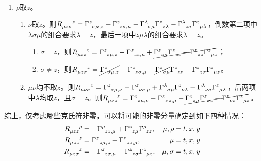 \begin{xiti}
\begin{jie}
\begin{enumerate}
			\item $\rho$取$z$。
			\begin{enumerate}
				\item $\nu$取$z$。则$\displaystyle \tensor{R}{_\mu_z_\sigma^z}= \ChristoffelSymbol{z}{\sigma}{{\mu,z}}- \ChristoffelSymbol{z}{z}{{\sigma,\mu}}+ \ChristoffelSymbol{\lambda}{\sigma}{\mu} \ChristoffelSymbol{z}{z}{\lambda}- \ChristoffelSymbol{\lambda}{z}{\sigma} \ChristoffelSymbol{z}{\mu}{\lambda} $，倒数第二项中$\lambda\sigma\mu $的组合要求$\lambda=z$，最后一项中$z\mu\lambda$的组合要求$\lambda=z$。
				\begin{enumerate}
					\item $\sigma=z$，则$\displaystyle \tensor{R}{_\mu_z_z^z}= \ChristoffelSymbol{z}{z}{{\mu,z}}- \ChristoffelSymbol{z}{z}{{z,\mu}}+\cancel{\ChristoffelSymbol{z}{z}{\mu} \ChristoffelSymbol{z}{z}{z}- \ChristoffelSymbol{z}{z}{z} \ChristoffelSymbol{z}{\mu}{z}}  $；
					\item $\sigma\neq z$，则$\displaystyle \tensor{R}{_\mu_z_\sigma^z}= \cancel{\ChristoffelSymbol{z}{\sigma}{{\mu,z}}}- \ChristoffelSymbol{z}{z}{{\sigma,\mu}}+ \cancel{\ChristoffelSymbol{z}{\sigma}{\mu}} \ChristoffelSymbol{z}{z}{z}- \ChristoffelSymbol{z}{z}{\sigma} \ChristoffelSymbol{z}{\mu}{z} $。
				\end{enumerate}
			\item $\mu\nu$均不取$z$。则$\displaystyle \tensor{R}{_\mu_\nu_\sigma^z}= \ChristoffelSymbol{z}{\sigma}{{\mu,\nu}}- \ChristoffelSymbol{z}{\nu}{{\sigma,\mu}}+ \ChristoffelSymbol{\lambda}{\sigma}{\mu} \ChristoffelSymbol{z}{\nu}{\lambda}- \ChristoffelSymbol{\lambda}{\nu}{\sigma} \ChristoffelSymbol{z}{\mu}{\lambda} $，后两项中$\lambda$均取$z$，且$\sigma=z$。则$\displaystyle \tensor{R}{_\mu_\nu_z^z}= \ChristoffelSymbol{z}{z}{{\mu,\nu}}- \ChristoffelSymbol{z}{\nu}{{z,\mu}}+ \cancel{\ChristoffelSymbol{z}{z}{\mu} \ChristoffelSymbol{z}{\nu}{z}- \ChristoffelSymbol{z}{\nu}{z} \ChristoffelSymbol{z}{\mu}{z}} $。
			\end{enumerate}
		\end{enumerate}
	综上，仅考虑哪些克氏符非零，可以将可能的非零分量确定到如下四种情况：
	\begin{align*}
	\tensor{R}{_\mu_z_z^\rho}&=- \ChristoffelSymbol{\rho}{z}{{z,\mu}}+ \ChristoffelSymbol{z}{z}{\mu} \ChristoffelSymbol{\rho}{z}{z}, & \mu,\rho&=t,x,y \\
	\tensor{R}{_\mu_z_z^z}&= \ChristoffelSymbol{z}{z}{{\mu,z}}- \ChristoffelSymbol{z}{z}{{z,\mu}}, & \mu&=t,x,y \\
	\tensor{R}{_\mu_z_\sigma^z}&=- \ChristoffelSymbol{z}{z}{{\sigma,\mu}}- \ChristoffelSymbol{z}{z}{\sigma} \ChristoffelSymbol{z}{\mu}{z}, & \mu,\sigma&=t,x,y \\

\end{align*}
\end{jie}
\end{xiti}
